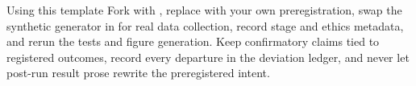 \documentclass[
  ignorenonframetext,
]{beamer}
\begin{document}
\begin{frame}{Using this template}
\protect{}\label{using-this-template}
Fork with , replace
 with your own preregistration,
swap the synthetic generator in
 for real data collection,
record stage and ethics metadata, and rerun the tests and figure
generation. Keep confirmatory claims tied to registered outcomes, record
every departure in the deviation ledger, and never let post-run result
prose rewrite the preregistered intent.
\end{frame}
\end{document}
